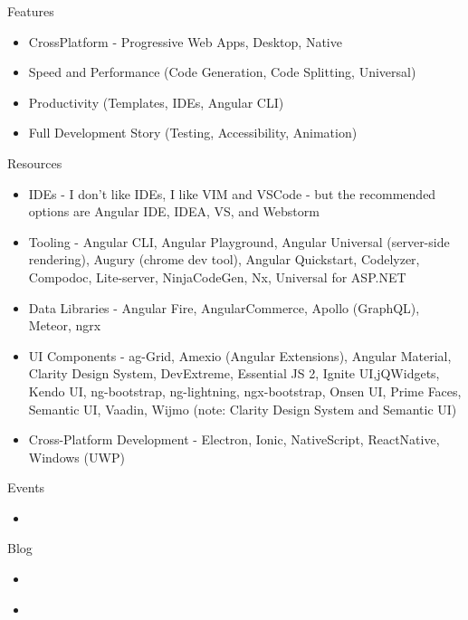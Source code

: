 Features
\begin{itemize}
  \item CrossPlatform - Progressive Web Apps, Desktop, Native
  \item Speed and Performance 
  (Code Generation, Code Splitting, Universal)
  \item Productivity         
  (Templates, IDEs, Angular CLI)
  \item Full Development Story     
  (Testing, Accessibility, Animation)
\end{itemize}
Resources
\begin{itemize}
  \item IDEs - I don't like IDEs, I like VIM and VSCode - but the recommended options are Angular IDE, IDEA, VS, and Webstorm
  \item Tooling -     
  Angular CLI, Angular Playground, Angular Universal (server-side rendering), Augury (chrome dev tool), Angular Quickstart, Codelyzer, Compodoc, Lite-server, NinjaCodeGen, Nx, Universal for ASP.NET
  \item Data Libraries - Angular Fire, AngularCommerce, Apollo (GraphQL), Meteor, ngrx
  \item UI Components -     
  ag-Grid, Amexio (Angular Extensions), Angular Material, Clarity Design System, DevExtreme, Essential JS 2, Ignite UI,jQWidgets, Kendo UI, ng-bootstrap, ng-lightning, ngx-bootstrap, Onsen UI, Prime Faces, Semantic UI, Vaadin, Wijmo (note: Clarity Design System and Semantic UI)
  \item Cross-Platform Development -    
   Electron, Ionic, NativeScript, ReactNative, Windows (UWP)
\end{itemize}
Events
\begin{itemize}
  \item 
\end{itemize}
Blog
\begin{itemize}
  \item 
\end{itemize}



\begin{itemize}
  \item 
  \end{itemize}
  
\onecolumn